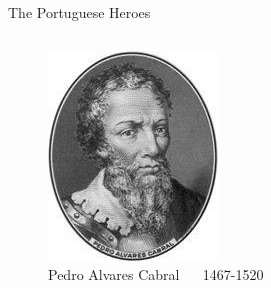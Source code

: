 \documentclass{beamer}
\begin{document}
\begin{frame}{The Portuguese Heroes}
\begin{columns}
\begin{figure}[ht]
\begin{center}
	\includegraphics[width=0.9 \columnwidth]{Cabral.jpg}
	\caption{\tiny Pedro Alvares Cabral ~~ 1467-1520}
	\end{center}
	\end{figure}


\end{columns}
\end{frame}
\end{document}
